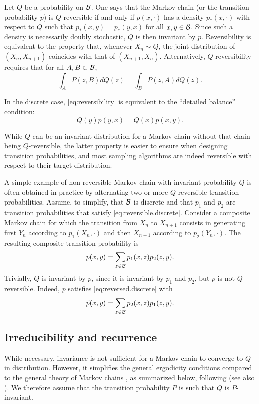 Let $Q$ be a probability on ${\mathcal B}$. 
One says that the Markov chain (or the transition probability $p$) is $Q$-reversible if and only if $p(x, \cdot)$ has a density $p_*(x, \cdot)$ with respect to $Q$ such that $p_*(x,y) = p_*(y,x)$ for all $x,y\in {\mathcal B}$. Since such a density is necessarily doubly stochastic, $Q$ is then invariant by $p$. Reversibility is equivalent to the property that,  whenever  $X_n \sim Q$, the joint distribution of $(X_n, X_{n+1})$ coincides with that of $(X_{n+1}, X_{n})$. Alternatively,
 $Q$-reversibility requires that for all $A, B\subset {\mathcal B}$, 
\begin{equation}
\label{eq:reversibility}
\int_{A} P(z, B) dQ(z) = \int_{B} P(z, A) dQ(z) .
\end{equation}

In the discrete case, \cref{eq:reversibility} is equivalent to the ``detailed balance'' condition:
\begin{equation}
\label{eq:reversible.discrete}
Q(y) p(y,x) = Q(x) p(x,y).
\end{equation}

While $Q$ can be an invariant distribution for a Markov chain without that chain being $Q$-reversible, the latter property is  easier to ensure when designing transition probabilities, and most sampling algorithms are indeed reversible with respect to their target distribution. 
\begin{remark}
\label{rem:reversible.iterate}
A simple example of non-reversible Markov chain with invariant probability $Q$ is often obtained in practice by alternating two or more  $Q$-reversible transition probabilities. Assume, to simplify, that ${\mathcal B}$ is discrete and that $p_1$ and $p_2$ are transition probabilities that satisfy \cref{eq:reversible.discrete}. Consider a composite Markov chain for which the transition from $X_n$ to $X_{n+1}$ consists in generating first $Y_n$ according to $p_1(X_n, \cdot)$ and then $X_{n+1}$ according to $p_2(Y_n, \cdot)$. The resulting composite transition probability is 
\[
p(x,y) = \sum_{z\in {\mathcal B}} p_1(x,z) p_2(z, y).
\]
Trivially, $Q$ is invariant by $p$, since it is invariant by $p_1$ and $p_2$, but $p$ is not $Q$-reversible. Indeed, $p$ satisfies \cref{eq:reversed.discrete} with 
\[
\tilde p(x,y) = \sum_{z\in {\mathcal B}} p_2(x,z) p_1(z, y).
\]
\end{remark}


\subsection{Irreducibility and recurrence}
While necessary, invariance is not sufficient for a Markov chain to converge to $Q$ in distribution. However, it simplifies the general ergodicity conditions compared to the  general theory of Markov chains \citep{nummelin2004general,revuz2008markov}, as summarized below, following \citep{tierney1994markov} (see also  \citep{athreya1996convergence}). We therefore assume that the transition probability $P$ is such that $Q$ is $P$-invariant.

